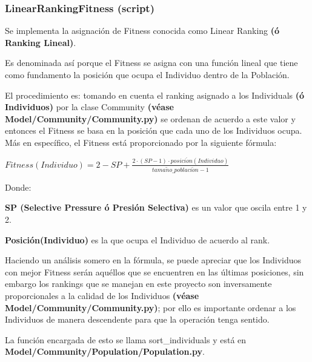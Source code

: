\documentclass[letterpaper,10pt,english]{sphinxmanual}
\begin{document}
\subsubsection{LinearRankingFitness (script)}
\label{Model/Fitness/LinearRankingFitness:linearrankingfitness-script}\label{Model/Fitness/LinearRankingFitness::doc}
\begin{DUlineblock}{0em}
\item[] Se implementa la asignación de Fitness conocida como Linear Ranking \textbf{(ó Ranking Lineal)}.
\item[] Es denominada así porque el Fitness se asigna con una función lineal que tiene como
fundamento la posición que ocupa el Individuo dentro de la Población.
\item[] El procedimiento es: tomando en cuenta el ranking asignado a los Individuals
\textbf{(ó Individuos)} por la clase Community \textbf{(véase Model/Community/Community.py)}
se ordenan de acuerdo a este valor y entonces el Fitness se basa en la posición
que cada uno de los Individuos ocupa. Más en específico, el Fitness está proporcionado
por la siguiente fórmula:
\end{DUlineblock}

\begin{center}\(Fitness(Individuo) = 2 - SP + \frac{2 \cdot (SP - 1) \cdot posici\acute{o}n(Individuo)}{tama\tilde{n}o\_poblaci\acute{o}n - 1}\)
\end{center}
\begin{DUlineblock}{0em}
\item[] Donde:
\item[]
\begin{DUlineblock}{\DUlineblockindent}
\item[] \textbf{SP (Selective Pressure ó Presión Selectiva)} es un valor que oscila entre 1 y 2.
\item[] \textbf{Posición(Individuo)} es la que ocupa el Individuo de acuerdo al rank.
\item[] 
\end{DUlineblock}
\item[] Haciendo un análisis somero en la fórmula, se puede apreciar que los
Individuos con mejor Fitness serán aquéllos que se encuentren en las últimas posiciones,
sin embargo los rankings que se manejan en este proyecto son inversamente proporcionales
a la calidad de los Individuos \textbf{(véase Model/Community/Community.py)};
por ello es importante ordenar a los Individuos de manera descendente para que la operación tenga sentido.
\item[] La función encargada de esto se llama sort\_individuals y está en \textbf{Model/Community/Population/Population.py}.
\end{DUlineblock}
\label{Model/Fitness/LinearRankingFitness:module-Model.Fitness.LinearRankingFitness}
\end{document}
